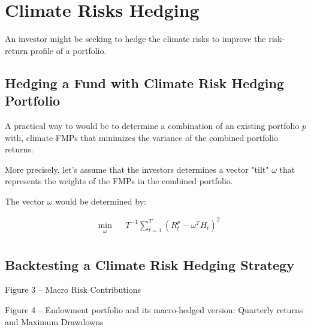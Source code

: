 \chapter{Climate Risks Hedging}

An investor might be seeking to hedge 
the climate risks to improve 
the risk-return profile of a portfolio.

\section{Hedging a Fund with Climate 
Risk Hedging Portfolio}

A practical way to would be to determine 
a combination of an existing portfolio $p$ with,
climate FMPs that minimizes the variance of 
the combined portfolio returns.

More precisely, let's assume that the 
investors determines a vector "tilt" 
$\omega$ that represents the weights of
the FMPs in the combined portfolio.

The vector $\omega$ would be determined by:

\begin{equation}
    \begin{aligned}
        & \underset{\omega}{\min}
        & &   T^{-1} \sum^T_{t=1} (R^p_t - \omega^T H_t)^2\\
    \end{aligned}
\end{equation}


\section{Backtesting a Climate Risk Hedging Strategy}

Figure 3 – Macro Risk Contributions

Figure 4 – Endowment portfolio and its macro-hedged version:
Quarterly returns and Maximum Drawdowns